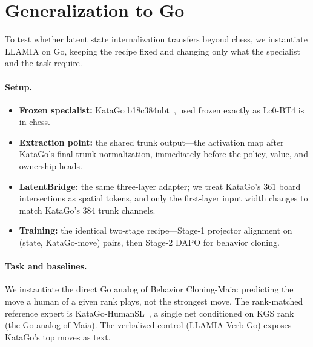 \section{Generalization to Go}
\label{sec:app_go}

To test whether latent state internalization transfers beyond chess, we instantiate LLAMIA on Go, keeping the recipe fixed and changing only what the specialist and the task require.

\paragraph{Setup.}
\begin{itemize}[leftmargin=1.2em, topsep=2pt, itemsep=1pt]
\item \textbf{Frozen specialist:} KataGo b18c384nbt~\cite{wu2019katago}, used frozen exactly as Lc0-BT4 is in chess.
\item \textbf{Extraction point:} the shared trunk output---the activation map after KataGo's final trunk normalization, immediately before the policy, value, and ownership heads.
\item \textbf{LatentBridge:} the same three-layer adapter; we treat KataGo's $361$ board intersections as spatial tokens, and only the first-layer input width changes to match KataGo's $384$ trunk channels.
\item \textbf{Training:} the identical two-stage recipe---Stage-1 projector alignment on (state, KataGo-move) pairs, then Stage-2 DAPO for behavior cloning.
\end{itemize}

\paragraph{Task and baselines.}
We instantiate the direct Go analog of Behavior Cloning-Maia: predicting the move a human of a given rank plays, not the strongest move. The rank-matched reference expert is KataGo-HumanSL~\cite{wu2024katagohuman}, a single net conditioned on KGS rank (the Go analog of Maia). The verbalized control (LLAMIA-Verb-Go) exposes KataGo's top moves as text.

